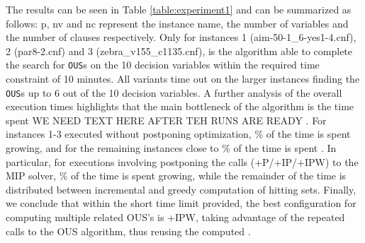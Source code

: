 The results can be seen in Table \ref{table:experiment1} and can be summarized as follows: p, nv and nc represent the instance name, the number of variables and the number of clauses respectively. 
Only for instances 1 (aim-50-1\_6-yes1-4.cnf), 2 (par8-2.cnf) and 3 (zebra\_v155\_c1135.cnf), is the algorithm able to complete the search for \texttt{OUS}s on the 10 decision variables within the required time constraint of 10 minutes.
All variants time out on the larger instances finding the \texttt{OUS}s up to 6 out of the 10 decision variables. 
A further analysis of the overall execution times highlights that the main bottleneck of the algorithm is the time spent WE NEED TEXT HERE AFTER TEH RUNS ARE READY \satsets
{}. For instances 1-3 executed without postponing optimization, \% of the time is spent growing, and for the remaining instances close to  \% of the time is spent  .
In particular, for executions involving postponing the calls (+P/+IP/+IPW) to the MIP solver, \% of the time is spent growing, while the remainder of the time is distributed between incremental and greedy computation of hitting sets.
Finally, we conclude that within the short time limit provided, the best configuration for computing multiple related OUS's is \omus+IPW, taking advantage of the repeated calls to the OUS algorithm, thus reusing the computed \satsets.

